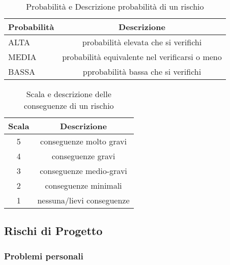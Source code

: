 \begin{table}[h!]
\centering
\begin{tabular}{|l|c|}
\hline
Probabilità& Descrizione\\
\hline
ALTA & probabilità elevata che si verifichi\\
MEDIA & probabilità equivalente nel verificarsi o meno\\
BASSA & pprobabilità bassa che si verifichi\\
\hline
\end{tabular}
\caption{Probabilità e Descrizione probabilità di un rischio}\label{tab:livellorischi}
\end{table}
\begin{table}[h!]
\centering
\begin{tabular}{|c|c|}
\hline
Scala& Descrizione  \\
\hline
5 & conseguenze molto gravi\\
4 & conseguenze gravi\\
3 & conseguenze medio-gravi\\
2 & conseguenze minimali\\
1 & nessuna/lievi conseguenze\\
\hline
\end{tabular}
\caption{Scala e descrizione delle conseguenze di un rischio}\label{tab:impattorischi}
\end{table}

\subsection{Rischi di Progetto}

\subsubsection{Problemi personali}

